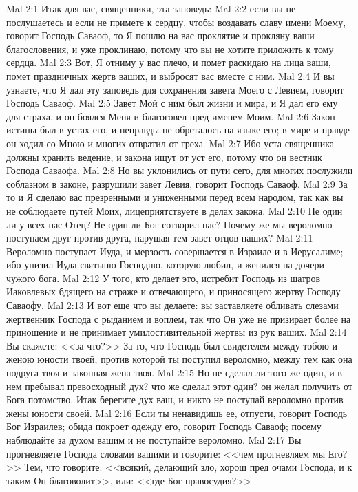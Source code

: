 \vs Mal 2:1 Итак для вас, священники, эта заповедь:
\vs Mal 2:2 если вы не послушаетесь и если не примете к сердцу, чтобы воздавать славу имени Моему, говорит Господь Саваоф, то Я пошлю на вас проклятие и прокляну ваши благословения, и уже проклинаю, потому что вы не хотите приложить к тому сердца.
\vs Mal 2:3 Вот, Я отниму у вас плечо, и помет раскидаю на лица ваши, помет праздничных жертв ваших, и выбросят вас вместе с ним.
\vs Mal 2:4 И вы узнаете, что Я дал эту заповедь для сохранения завета Моего с Левием, говорит Господь Саваоф.
\vs Mal 2:5 Завет Мой с ним был  жизни и мира, и Я дал его ему для страха, и он боялся Меня и благоговел пред именем Моим.
\vs Mal 2:6 Закон истины был в устах его, и неправды не обреталось на языке его; в мире и правде он ходил со Мною и многих отвратил от греха.
\vs Mal 2:7 Ибо уста священника должны хранить ведение, и закона ищут от уст его, потому что он вестник Господа Саваофа.
\vs Mal 2:8 Но вы уклонились от пути сего, для многих послужили соблазном в законе, разрушили завет Левия, говорит Господь Саваоф.
\vs Mal 2:9 За то и Я сделаю вас презренными и униженными перед всем народом, так как вы не соблюдаете путей Моих, лицеприятствуете в делах закона.
\vs Mal 2:10 Не один ли у всех нас Отец? Не один ли Бог сотворил нас? Почему же мы вероломно поступаем друг против друга, нарушая тем завет отцов наших?
\vs Mal 2:11 Вероломно поступает Иуда, и мерзость совершается в Израиле и в Иерусалиме; ибо унизил Иуда святыню Господню, которую любил, и женился на дочери чужого бога.
\vs Mal 2:12 У того, кто делает это, истребит Господь из шатров Иаковлевых бдящего на страже и отвечающего, и приносящего жертву Господу Саваофу.
\vs Mal 2:13 И вот еще что вы делаете: вы заставляете обливать слезами жертвенник Господа с рыданием и воплем, так что Он уже не призирает более на приношение и не принимает умилостивительной жертвы из рук ваших.
\vs Mal 2:14 Вы скажете: <<за что?>> За то, что Господь был свидетелем между тобою и женою юности твоей, против которой ты поступил вероломно, между тем как она подруга твоя и законная жена твоя.
\vs Mal 2:15 Но не сделал ли того же один, и в нем пребывал превосходный дух? что же сделал этот один? он желал получить от Бога потомство. Итак берегите дух ваш, и никто не поступай вероломно против жены юности своей.
\vs Mal 2:16 Если ты ненавидишь ее, отпусти, говорит Господь Бог Израилев; обида покроет одежду его, говорит Господь Саваоф; посему наблюдайте за духом вашим и не поступайте вероломно.
\vs Mal 2:17 Вы прогневляете Господа словами вашими и говорите: <<чем прогневляем мы Его?>> Тем, что говорите: <<всякий, делающий зло, хорош пред очами Господа, и к таким Он благоволит>>, или: <<где Бог правосудия?>>
